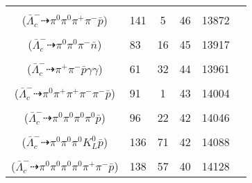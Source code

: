 \documentclass[landscape]{article}
\newcounter{rownumbers}
\newcommand\rn{\stepcounter{rownumbers}\arabic{rownumbers}}
\newcommand{\EOL}{\\} %
\newcommand{\topoTags}[1]{#1} %
\begin{document}
\begin{longtable}{clcccc}
\rn & \makecell[l]{ $ 
\bar{\Lambda}_{c}^{-} \rightarrow \eta \bar{\Sigma}^{-} ,
\eta \rightarrow \pi^{0} \pi^{+} \pi^{-} ,
\bar{\Sigma}^{-} \rightarrow \pi^{0} \bar{p} 
$ \\ ($
\bar{\Lambda}_{c}^{-} \dashrightarrow \pi^{0} \pi^{0} \pi^{+} \pi^{-} \bar{p} 
$) } & \topoTags{141 & 5 & }46 & 13872 \EOL

\rn & \makecell[l]{ $ 
\bar{\Lambda}_{c}^{-} \rightarrow \pi^{-} K^{0} \bar{n} ,
K^{0} \rightarrow K_{S}^{0} ,
K_{S}^{0} \rightarrow \pi^{0} \pi^{0} 
$ \\ ($
\bar{\Lambda}_{c}^{-} \dashrightarrow \pi^{0} \pi^{0} \pi^{-} \bar{n} 
$) } & \topoTags{83 & 16 & }45 & 13917 \EOL

\rn & \makecell[l]{ $ 
\bar{\Lambda}_{c}^{-} \rightarrow \pi^{-} \eta \bar{\Lambda} ,
\eta \rightarrow \gamma \gamma ,
\bar{\Lambda} \rightarrow \pi^{+} \bar{p} 
$ \\ ($
\bar{\Lambda}_{c}^{-} \dashrightarrow \pi^{+} \pi^{-} \bar{p} \gamma \gamma 
$) } & \topoTags{61 & 32 & }44 & 13961 \EOL

\rn & \makecell[l]{ $ 
\bar{\Lambda}_{c}^{-} \rightarrow \eta \bar{\Sigma}^{*-} ,
\eta \rightarrow \pi^{0} \pi^{+} \pi^{-} ,
\bar{\Sigma}^{*-} \rightarrow \pi^{-} \bar{\Lambda} ,
\bar{\Lambda} \rightarrow \pi^{+} \bar{p} 
$ \\ ($
\bar{\Lambda}_{c}^{-} \dashrightarrow \pi^{0} \pi^{+} \pi^{+} \pi^{-} \pi^{-} \bar{p} 
$) } & \topoTags{91 & 1 & }43 & 14004 \EOL

\rn & \makecell[l]{ $ 
\bar{\Lambda}_{c}^{-} \rightarrow \eta \bar{\Sigma}^{-} ,
\eta \rightarrow \pi^{0} \pi^{0} \pi^{0} ,
\bar{\Sigma}^{-} \rightarrow \pi^{0} \bar{p} 
$ \\ ($
\bar{\Lambda}_{c}^{-} \dashrightarrow \pi^{0} \pi^{0} \pi^{0} \pi^{0} \bar{p} 
$) } & \topoTags{96 & 22 & }42 & 14046 \EOL

\rn & \makecell[l]{ $ 
\bar{\Lambda}_{c}^{-} \rightarrow \eta K^{0} \bar{p} ,
\eta \rightarrow \pi^{0} \pi^{0} \pi^{0} ,
K^{0} \rightarrow K_{L}^{0} 
$ \\ ($
\bar{\Lambda}_{c}^{-} \dashrightarrow \pi^{0} \pi^{0} \pi^{0} K_{L}^{0} \bar{p} 
$) } & \topoTags{136 & 71 & }42 & 14088 \EOL

\rn & \makecell[l]{ $ 
\bar{\Lambda}_{c}^{-} \rightarrow \eta^{\prime} \bar{\Sigma}^{-} ,
\eta^{\prime} \rightarrow \pi^{0} \pi^{0} \eta ,
\bar{\Sigma}^{-} \rightarrow \pi^{0} \bar{p} ,
\eta \rightarrow \pi^{0} \pi^{+} \pi^{-} 
$ \\ ($
\bar{\Lambda}_{c}^{-} \dashrightarrow \pi^{0} \pi^{0} \pi^{0} \pi^{0} \pi^{+} \pi^{-} \bar{p} 
$) } & \topoTags{138 & 57 & }40 & 14128 \EOL


\end{longtable}
\end{document}
